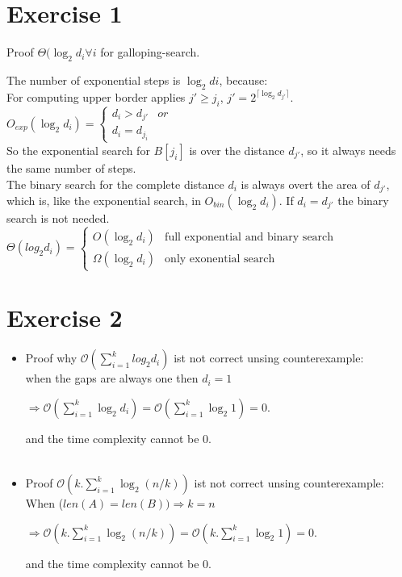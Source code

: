 \documentclass[a4paper,
twoside, %
headlines=2.1 %
]{scrartcl}
\author{\yourname}
\title{\lecture}
\subtitle{Exercise Sheet \sheetnum}
\begin{document}
\maketitle
\section*{Exercise 1}
Proof $\Theta(\log_2 d_i \forall i$ for galloping-search.

The number of exponential  steps is $\log_2 di$, because:\\
For computing upper border applies $j' \geq j_i$, $j' = 2^{\lceil\log_2 d_{j'}\rceil}$.\\
$O_{exp}(\log_2 d_i) = \begin{cases}
d_i > d_{j'} & or\\
d_i = d_{j_i}
\end{cases}$\\
So the exponential search for $B[j_i]$ is over the distance $d_{j'}$, so it always needs the same number of steps.\\

The binary search for the complete distance $d_i$ is always overt the area of $d_{j'}$, which is, like the exponential search, in $O_{bin}(\log_2 d_i)$. If $d_i = d_{j'}$ the binary search is not needed.\\
$\Theta(log_2 d_i) = \begin{cases} O(\log_2 d_i) & \text{full exponential and binary search}\\ 
\Omega(\log_2 d_i) & \text{only exonential search}
\end{cases}$ 


\section*{Exercise 2}
\begin{itemize} 
\item Proof why
$\mathcal{O}(\sum\limits_{i=1}^{k} log_2 d_i )$ ist not correct  unsing counterexample:
\\
when the gaps are always one then $d_i = 1$
\begin{center}
$ \Longrightarrow \mathcal{O}(\sum\limits_{i=1}^{k} \log_{2}{d_i} ) = \mathcal{O}(\sum\limits_{i=1}^{k} \log_{2}{1} )= 0 $.
\end{center}
and the time complexity cannot be 0.
\\
\\
\noindent
\item Proof
$\mathcal{O}(k . \sum\limits_{i=1}^{k} \log_{2}{(n/k)} )$ ist not correct unsing counterexample:
\\
When  ($len(A) = len(B)) \Longrightarrow k = n$
\begin{center}
$ \Longrightarrow \mathcal{O}(k.\sum\limits_{i=1}^{k} \log_{2}{(n/k)} ) = \mathcal{O}(k.\sum\limits_{i=1}^{k} \log_{2}{1} )= 0 $.
\end{center}
and the time complexity cannot be 0.

\end{itemize}
\end{document}
